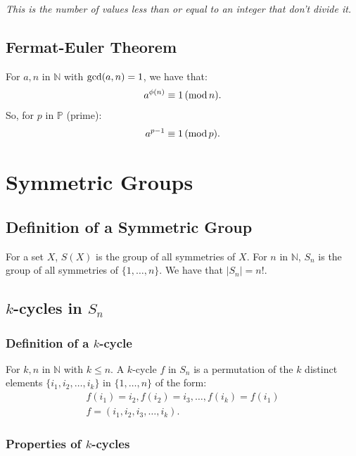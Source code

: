 \documentclass[a4paper, 12pt, twoside]{article}
\begin{document}
\vspace{\baselineskip}

\textit{This is the number of values less than or equal to an integer
      that don't divide it.}

\subsection{Fermat-Euler Theorem}

For $a, n$ in $\mathbb{N}$ with $\operatorname{gcd}(a, n) = 1$, we have that:
\begin{align*}
      a^{\phi(n)} \equiv 1 \, (\operatorname{mod} n).
\end{align*}
So, for $p$ in $\mathbb{P}$ (prime):
\begin{align*}
      a^{p - 1} \equiv 1 \, (\operatorname{mod} p).
\end{align*}

\section{Symmetric Groups}

\subsection{Definition of a Symmetric Group}

For a set $X$, $S(X)$ is the group of all symmetries of $X$.
For $n$ in $\mathbb{N}$, $S_n$ is the group of all symmetries of
$\{1, \ldots, n\}$. We have that $|S_n| = n!$.

\subsection{$k$-cycles in $S_n$}

\subsubsection{Definition of a $k$-cycle}

For $k, n$ in $\mathbb{N}$ with $k \leq n$. A $k$-cycle $f$ in $S_n$
is a permutation of the $k$ distinct elements $\{i_1, i_2, \ldots,
      i_k\}$ in $\{1, \ldots, n\}$ of the form:
\begin{gather*}
      f(i_1) = i_2, f(i_2) = i_3, \ldots, f(i_k) = f(i_1) \\
      f = (i_1, i_2, i_3, \ldots, i_k).
\end{gather*}

\subsubsection{Properties of $k$-cycles}
\end{document}
